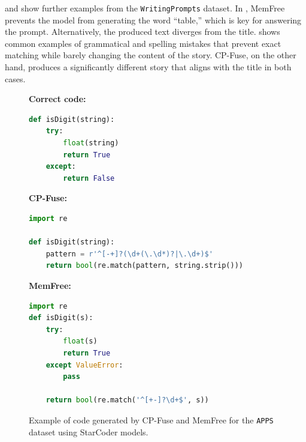  and  show further examples from the \texttt{WritingPrompts} dataset. In , MemFree prevents the model from generating the word ``table,'' which is key for answering the prompt. Alternatively, the produced text diverges from the title.  shows common examples of grammatical and spelling mistakes that prevent exact matching while barely changing the content of the story. CP-Fuse, on the other hand, produces a significantly different story that aligns with the title in both cases.

\begin{figure}[!htbp]
    \centering
    \begin{promptmdftwomem}
        \textbf{Correct code:}
    \begin{lstlisting}[style=mystyle, language=Python]
def isDigit(string):
    try:
        float(string)
        return True
    except:
        return False
        \end{lstlisting}
        \textbf{CP-Fuse:}
        \begin{lstlisting}[style=mystyle, language=Python]
import re

def isDigit(string):
    pattern = r'^[-+]?(\d+(\.\d*)?|\.\d+)$'
    return bool(re.match(pattern, string.strip()))

        \end{lstlisting}
        \textbf{MemFree:}
        \begin{lstlisting}[style=mystyle, language=Python]
import re
def isDigit(s):
    try:
        float(s)
        return True
    except ValueError:
        pass
    
    return bool(re.match('^[+-]?\d+$', s))
        \end{lstlisting}
    \end{promptmdftwomem}
    \caption{Example of code generated by CP-Fuse and MemFree for the \texttt{APPS} dataset using StarCoder models.}       \label{fig:example2_code_memfree}
\end{figure}




